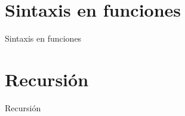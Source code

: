 \documentclass{beamer}
\begin{document}
\section{Sintaxis en funciones}
\begin{frame}{Sintaxis en funciones}      %

\end{frame}

\section{Recursión}
\begin{frame}{Recursión}      %

\end{frame}
\end{document}
